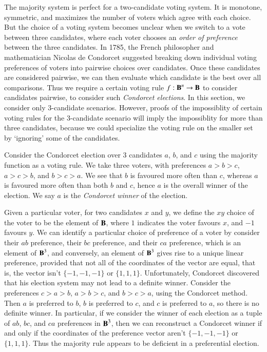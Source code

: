 The majority system is perfect for a two-candidate voting system. It is monotone, symmetric, and maximizes the number of voters which agree with each choice. But the choice of a voting system becomes unclear when we switch to a vote between three candidates, where each voter chooses an {\it order of preference} between the three candidates. In 1785, the French philosopher and mathematician Nicolas de Condorcet suggested breaking down individual voting preferences of voters into pairwise choices over candidates. Once these candidates are considered pairwise, we can then evaluate which candidate is the best over all comparisons. Thus we require a certain voting rule $f: \operatorname{\mathbf{B}}^n \to \operatorname{\mathbf{B}}$ to consider candidates pairwise, to consider such \emph{Condorcet elections}. In this section, we consider only 3-candidate scenarios. However, proofs of the impossiblity of certain voting rules for the 3-candidate scenario will imply the impossiblity for more than three candidates, because we could specialize the voting rule on the smaller set by `ignoring' some of the candidates.

\begin{example}
    Consider the Condorcet election over 3 candidates $a$, $b$, and $c$ using the majority function as a voting rule. We take three voters, with preferences $a > b > c$, $a > c > b$, and $b > c > a$. We see that $b$ is favoured more often than $c$, whereas $a$ is favoured more often than both $b$ and $c$, hence $a$ is the overall winner of the election. We say $a$ is the \emph{Condorcet winner} of the election.
\end{example}

Given a particular voter, for two candidates $x$ and $y$, we define the $xy$ choice of the voter to be the element of $\operatorname{\mathbf{B}}$, where $1$ indicates the voter favours $x$, and $-1$ favours $y$. We can identify a particular choice of preference of a voter by consider their $ab$ preference, their $bc$ preference, and their $ca$ preference, which is an element of $\operatorname{\mathbf{B}}^3$, and conversely, an element of $\operatorname{\mathbf{B}}^3$ gives rise to a unique linear preference, provided that not all of the coordinates of the vector are equal, that is, the vector isn't $\{ -1, -1, -1 \}$ or $\{ 1, 1, 1 \}$. Unfortunately, Condorcet discovered that his election system may not lead to a definite winner. Consider the preferences $c > a > b$, $a > b > c$, and $b > c > a$, using the Condorcet method. Then $a$ is preferred to $b$, $b$ is preferred to $c$, and $c$ is preferred to $a$, so there is no definite winner. In particular, if we consider the winner of each election as a tuple of $ab$, $bc$, and $ca$ preferences in $\operatorname{\mathbf{B}}^3$, then we can reconstruct a Condorcet winner if and only if the coordinates of the preference vector aren't $\{ -1, -1, -1 \}$ or $\{ 1, 1, 1 \}$. Thus the majority rule appears to be deficient in a preferential election.

